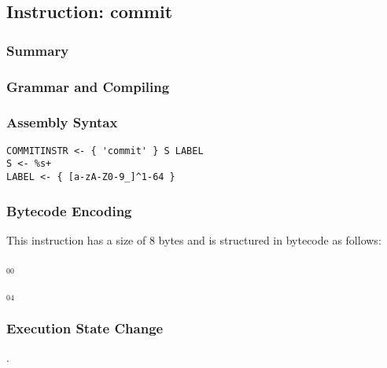 \subsection{Instruction: commit}

\subsubsection{Summary}


\subsubsection{Grammar and Compiling}


\subsubsection{Assembly Syntax}

\begin{myquote}
\begin{verbatim}
COMMITINSTR <- { 'commit' } S LABEL
S <- %s+
LABEL <- { [a-zA-Z0-9_]^1-64 }
\end{verbatim}
\end{myquote}


\subsubsection{Bytecode Encoding}

This instruction has a size of 8 bytes and is structured in bytecode as follows:

$_{00}$\ 



$_{04}$\ 


\subsubsection{Execution State Change}

.


